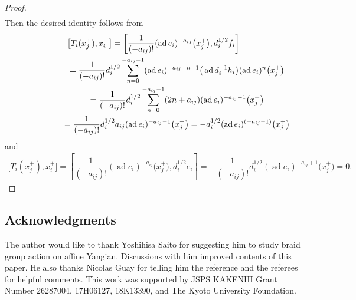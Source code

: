 \documentclass[pdftex]{sigma}
\theoremstyle{definition}
\numberwithin{equation}{section}
\DeclareMathOperator{\ad}{ad}
\begin{document}
\begin{proof}
\begin{gather*}
\end{gather*}
Then the desired identity follows from
\begin{gather*}
\big[T_i(x_j^+), x_i^-\big] = \left[\dfrac{1}{(-a_{ij})!} (\ad e_i)^{-a_{ij}}\big(x_j^+\big),d_i^{1/2} f_i\right]\\
\hphantom{\big[T_i(x_j^+), x_i^-\big]}{} = \dfrac{1}{(-a_{ij})!} d_i^{1/2} \sum_{n=0}^{-a_{ij}-1} (\ad e_i)^{-a_{ij}-n-1} \big(\ad d_i^{-1} h_i\big) (\ad e_i)^{n} \big(x_j^+\big) \\
\hphantom{\big[T_i(x_j^+), x_i^-\big]}{} = \dfrac{1}{(-a_{ij})!} d_i^{1/2} \sum_{n=0}^{-a_{ij}-1} (2n+a_{ij}) (\ad e_i)^{-a_{ij}-1} \big(x_j^+\big) \\
\hphantom{\big[T_i(x_j^+), x_i^-\big]}{} = \dfrac{1}{(-a_{ij})!} d_i^{1/2} a_{ij} (\ad e_i)^{-a_{ij}-1} \big(x_j^+\big)
 = -d_i^{1/2}(\ad e_i)^{(-a_{ij}-1)}\big(x_j^+\big)
\end{gather*}
and
\begin{gather*}
\big[T_i(x_j^+), x_i^+\big] = \left[\dfrac{1}{(-a_{ij})!} (\ad e_i)^{-a_{ij}}\big(x_j^+\big),d_i^{1/2} e_i\right] = -\dfrac{1}{(-a_{ij})!} d_i^{1/2} (\ad e_i)^{-a_{ij}+1}\big(x_j^+\big)=0.\!\!\!\!\tag*{\qed}
\end{gather*} \renewcommand{\qed}{}
\end{proof}

\subsection*{Acknowledgments}
The author would like to thank Yoshihisa Saito for suggesting him to study braid group action on affine Yangian. Discussions with him improved contents of this paper. He also thanks Nicolas Guay for telling him the reference \cite{MR1745710} and the referees for helpful comments. This work was supported by JSPS KAKENHI Grant Number 26287004, 17H06127, 18K13390, and The Kyoto University Foundation.
\end{document}
